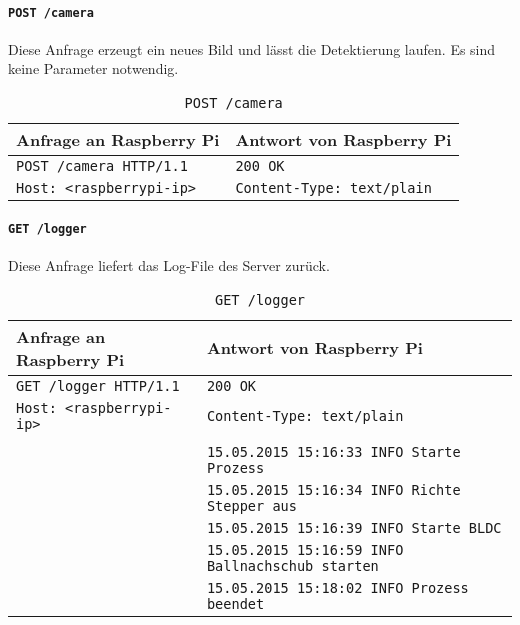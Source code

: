 \paragraph{\texttt{POST /camera}}

Diese Anfrage erzeugt ein neues Bild und lässt die Detektierung laufen. Es sind keine Parameter notwendig.

\begin{table}[h!]
	\centering
	\begin{tabular}{|l|l|}
		\hline Anfrage an Raspberry Pi & Antwort von Raspberry Pi \\ 
		\hline \texttt{POST /camera HTTP/1.1} & \texttt{200 OK} \\
		\texttt{Host: <raspberrypi-ip>} & \texttt{Content-Type: text/plain} \\
		\hline 
	\end{tabular} 
	\caption{\texttt{POST /camera}}
	\label{tab:post-camera}
\end{table}

\paragraph{\texttt{GET /logger}}

Diese Anfrage liefert das Log-File des Server zurück.

\begin{table}[h!]
	\centering
	\begin{tabular}{|l|l|}
		\hline Anfrage an Raspberry Pi & Antwort von Raspberry Pi \\ 
		\hline \texttt{GET /logger HTTP/1.1} & \texttt{200 OK} \\
		\texttt{Host: <raspberrypi-ip>} & \texttt{Content-Type: text/plain} \\
		& \\
		& \verb|15.05.2015 15:16:33 INFO Starte Prozess| \\
		& \verb|15.05.2015 15:16:34 INFO Richte Stepper aus| \\
		& \verb|15.05.2015 15:16:39 INFO Starte BLDC| \\
		& \verb|15.05.2015 15:16:59 INFO Ballnachschub starten| \\
		& \verb|15.05.2015 15:18:02 INFO Prozess beendet| \\
		\hline 
	\end{tabular} 
	\caption{\texttt{GET /logger}}
	\label{tab:get-logger}
\end{table}

\newpage

